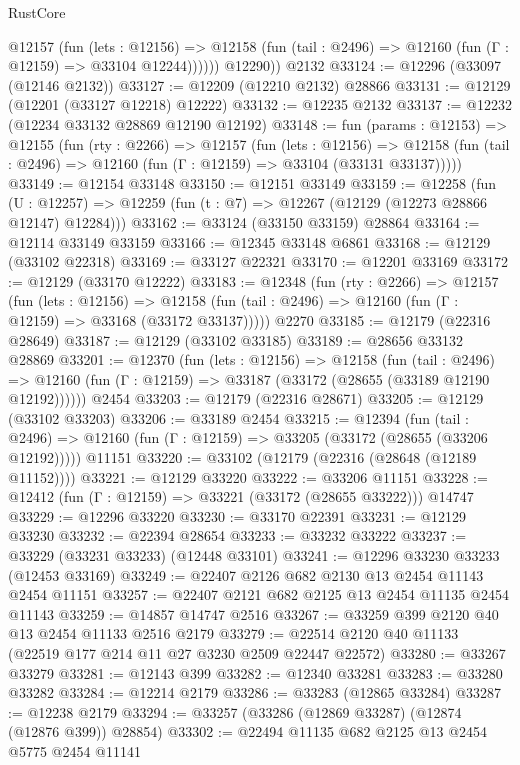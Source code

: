 \begin{lexlean}{RustCore}
\begin{coremodule}
            @12157
              (fun (lets : @12156) =>
              @12158 (fun (tail : @2496) => @12160 (fun (Γ : @12159) => @33104 @12244))))))
        @12290))
    @2132
@33124 := @12296 (@33097 (@12146 @2132))
@33127 := @12209 (@12210 @2132) @28866
@33131 := @12129 (@12201 (@33127 @12218) @12222)
@33132 := @12235 @2132
@33137 := @12232 (@12234 @33132 @28869 @12190 @12192)
@33148 := fun (params : @12153) =>
  @12155
    (fun (rty : @2266) =>
    @12157
      (fun (lets : @12156) =>
      @12158 (fun (tail : @2496) => @12160 (fun (Γ : @12159) => @33104 (@33131 @33137)))))
@33149 := @12154 @33148
@33150 := @12151 @33149
@33159 := @12258
    (fun (U : @12257) => @12259 (fun (t : @7) => @12267 (@12129 (@12273 @28866 @12147) @12284)))
@33162 := @33124 (@33150 @33159) @28864
@33164 := @12114 @33149 @33159
@33166 := @12345 @33148 @6861
@33168 := @12129 (@33102 @22318)
@33169 := @33127 @22321
@33170 := @12201 @33169
@33172 := @12129 (@33170 @12222)
@33183 := @12348
    (fun (rty : @2266) =>
    @12157
      (fun (lets : @12156) =>
      @12158 (fun (tail : @2496) => @12160 (fun (Γ : @12159) => @33168 (@33172 @33137)))))
    @2270
@33185 := @12179 (@22316 @28649)
@33187 := @12129 (@33102 @33185)
@33189 := @28656 @33132 @28869
@33201 := @12370
    (fun (lets : @12156) =>
    @12158
      (fun (tail : @2496) =>
      @12160 (fun (Γ : @12159) => @33187 (@33172 (@28655 (@33189 @12190 @12192))))))
    @2454
@33203 := @12179 (@22316 @28671)
@33205 := @12129 (@33102 @33203)
@33206 := @33189 @2454
@33215 := @12394
    (fun (tail : @2496) => @12160 (fun (Γ : @12159) => @33205 (@33172 (@28655 (@33206 @12192)))))
    @11151
@33220 := @33102 (@12179 (@22316 (@28648 (@12189 @11152))))
@33221 := @12129 @33220
@33222 := @33206 @11151
@33228 := @12412 (fun (Γ : @12159) => @33221 (@33172 (@28655 @33222))) @14747
@33229 := @12296 @33220
@33230 := @33170 @22391
@33231 := @12129 @33230
@33232 := @22394 @28654
@33233 := @33232 @33222
@33237 := @33229 (@33231 @33233) (@12448 @33101)
@33241 := @12296 @33230 @33233 (@12453 @33169)
@33249 := @22407 @2126 @682 @2130 @13 @2454 @11143 @2454 @11151
@33257 := @22407 @2121 @682 @2125 @13 @2454 @11135 @2454 @11143
@33259 := @14857 @14747 @2516
@33267 := @33259 @399 @2120 @40 @13 @2454 @11133 @2516 @2179
@33279 := @22514 @2120 @40 @11133 (@22519 @177 @214 @11 @27 @3230 @2509 @22447 @22572)
@33280 := @33267 @33279
@33281 := @12143 @399
@33282 := @12340 @33281
@33283 := @33280 @33282
@33284 := @12214 @2179
@33286 := @33283 (@12865 @33284)
@33287 := @12238 @2179
@33294 := @33257 (@33286 (@12869 @33287) (@12874 (@12876 @399)) @28854)
@33302 := @22494 @11135 @682 @2125 @13 @2454 @5775 @2454 @11141

\end{coremodule}
\end{lexlean}
